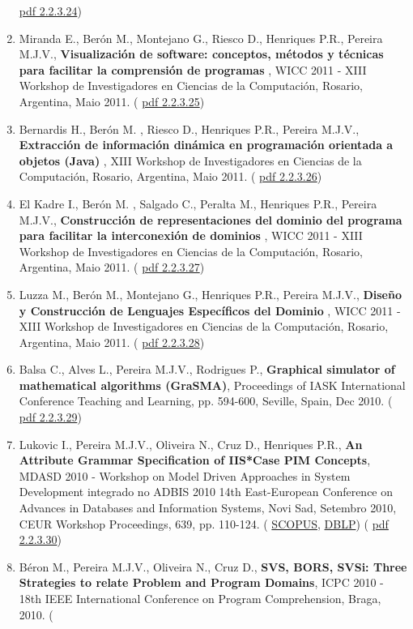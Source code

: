\documentclass[11pt]{article}
\begin{document}
\begin{enumerate}
{\href{run:Publicacoes/publicacoes/57.pdf}{pdf 2.2.3.24})}
\item{Miranda E., Berón M., Montejano G., Riesco D., Henriques P.R., Pereira M.J.V., {
\bf{ Visualización de software: conceptos, métodos y técnicas para facilitar la comprensión de programas}} , WICC 2011 - XIII Workshop de Investigadores en Ciencias de la Computación, Rosario, Argentina, Maio 2011. (
\href{run:Publicacoes/publicacoes/58.pdf}{pdf 2.2.3.25})}
\item{Bernardis H.,  Berón M. , Riesco D., Henriques P.R., Pereira M.J.V., {
\bf{ Extracción de información dinámica en programación orientada a objetos (Java)}} , XIII Workshop de Investigadores en Ciencias de la Computación, Rosario, Argentina, Maio 2011. (
\href{run:Publicacoes/publicacoes/62.pdf}{pdf 2.2.3.26})}
\item{El Kadre I.,  Berón M. , Salgado C., Peralta M., Henriques P.R., Pereira M.J.V., {
\bf{ Construcción de representaciones del dominio del programa para facilitar la interconexión de dominios}} , WICC 2011 - XIII Workshop de Investigadores en Ciencias de la Computación, Rosario, Argentina, Maio 2011. (
\href{run:Publicacoes/publicacoes/61.pdf}{pdf 2.2.3.27})}
\item{Luzza M.,  Berón M., Montejano G., Henriques P.R., Pereira M.J.V., {
\bf{ Diseño y Construcción de Lenguajes Específicos del Dominio}} , WICC 2011 - XIII Workshop de Investigadores en Ciencias de la Computación, Rosario, Argentina, Maio 2011. (
\href{run:Publicacoes/publicacoes/63.pdf}{pdf 2.2.3.28})}
\item{Balsa C., Alves L., Pereira M.J.V., Rodrigues P., {
\bf{ Graphical simulator of mathematical algorithms (GraSMA)}}, Proceedings of IASK International Conference Teaching and Learning, pp. 594-600, Seville, Spain, Dec 2010. (
\href{run:Publicacoes/publicacoes/84.pdf}{pdf 2.2.3.29})}
\item{Lukovic I., Pereira M.J.V., Oliveira N., Cruz D., Henriques P.R., {
\bf{ An Attribute Grammar Specification of IIS*Case PIM Concepts}}, MDASD 2010 - Workshop on Model Driven Approaches in System Development integrado no ADBIS 2010 14th East-European Conference on Advances in Databases and Information Systems, Novi Sad, Setembro 2010, CEUR Workshop Proceedings, 639, pp. 110-124. (
\href{run:Publicacoes/PublicacoesSCOPUS.pdf}{SCOPUS}, 
\href{run:Publicacoes/ComprovativosDBLP.pdf}{DBLP}) (
\href{run:Publicacoes/publicacoes/50.pdf}{pdf 2.2.3.30})}
\item{Béron M., Pereira M.J.V., Oliveira N., Cruz D., {
\bf{ SVS, BORS, SVSi: Three Strategies to relate Problem and Program Domains}}, ICPC 2010 - 18th IEEE International Conference on Program Comprehension, Braga, 2010. (
}
\end{enumerate}
\end{document}
